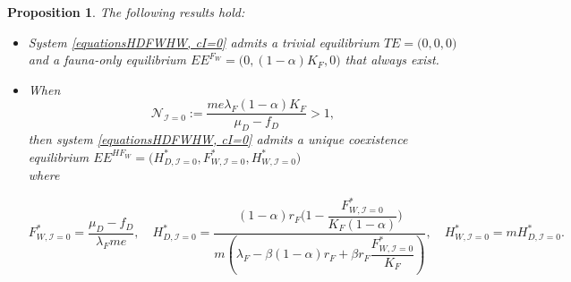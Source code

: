 \documentclass{article}
\newcommand{\lfw}{\lambda_{F}}
\newcommand{\lfw}{\lambda_{F}}
\newcommand{\cI}{\mathcal{I}}
\newtheorem{prop}{Proposition}
\begin{document}
\begin{prop}
\label{theoremEquilibre, cI=0}
The following results hold:
\begin{itemize}
\item System \eqref{equationsHDFWHW, cI=0} admits a trivial equilibrium $TE = \Big(0,0,0\Big)$ and a fauna-only equilibrium $EE^{F_W} = \Big(0, (1-\alpha)K_F, 0 \Big)$ that always exist.

\item When
$$
\mathcal{N}_{\cI = 0} := \dfrac{m e \lfw (1-\alpha)K_F}{\mu_D - f_D} >1,
$$ 
then system \eqref{equationsHDFWHW, cI=0} admits a unique coexistence equilibrium $EE^{HF_W} = \Big(H^*_{D, \cI = 0}, F^*_{W, \cI = 0}, H^*_{W, \cI = 0} \Big)$ \\ 
where 


$$F^*_{W, \cI = 0} = \dfrac{\mu_D - f_D}{\lfw m e},
\quad 
H^*_{D, \cI = 0} = \dfrac{(1-\alpha)r_F\Big(1 - \dfrac{F^*_{W, \cI = 0}}{K_F(1-\alpha)} \Big)}{m\left(\lfw - \beta (1-\alpha) r_F + \beta r_F  \dfrac{F^*_{W, \cI = 0}}{K_F}\right)} ,
\quad 
H^*_{W, \cI = 0} = m H^*_{D, \cI = 0}.$$
\end{itemize}
\end{prop}
\end{document}
